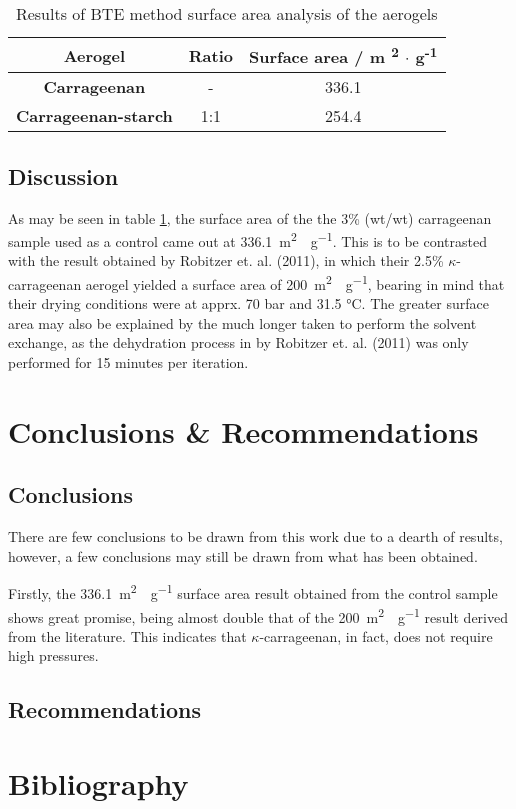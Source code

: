 \documentclass[a4paper,12pt]{article}
\begin{document}
\begin{table}[H]
\centering
\caption{Results of BTE method surface area analysis of the aerogels}
\label{tab3}
\begin{tabular}{@{}ccc@{}}
\toprule
\textbf{Aerogel} & \textbf{Ratio} & \textbf{Surface area / m \textsuperscript{2} $\cdot$ g\textsuperscript{-1}} \\ \midrule
\textbf{Carrageenan} & - & 336.1 \\
\textbf{Carrageenan-starch} & 1:1 & 254.4 \\ \bottomrule
\end{tabular}
\end{table}

\subsection{Discussion}

As may be seen in table \ref{tab3}, the surface area of the the 3\% (wt/wt) carrageenan sample used as a control came out at \SI{336.1}{m^2\cdot g^{-1}}. This is to be contrasted with the result obtained by Robitzer et. al. (2011), in which their 2.5\% $\kappa$-carrageenan aerogel yielded a surface area of \SI{200}{m^2\cdot g^{-1}}, bearing in mind that their drying conditions were at apprx. 70 bar and 31.5 °C. The greater surface area may also be explained by the much longer taken to perform the solvent exchange, as the dehydration process in by Robitzer et. al. (2011) was only performed for 15 minutes per iteration.\supercite{robitzer_nitrogen_2011}

\pagebreak

\section{Conclusions \& Recommendations}

\subsection{Conclusions}

There are few conclusions to be drawn from this work due to a dearth of results, however, a few conclusions may still be drawn from what has been obtained.

Firstly, the  \SI{336.1}{m^2\cdot g^{-1}} surface area result obtained from the control sample shows great promise, being almost double that of the \SI{200}{m^2\cdot g^{-1}} result derived from the literature. This indicates that $\kappa$-carrageenan, in fact, does not require high pressures.

\subsection{Recommendations}

\pagebreak

\section{Bibliography}


\printbibliography[heading=none]
\end{document}
